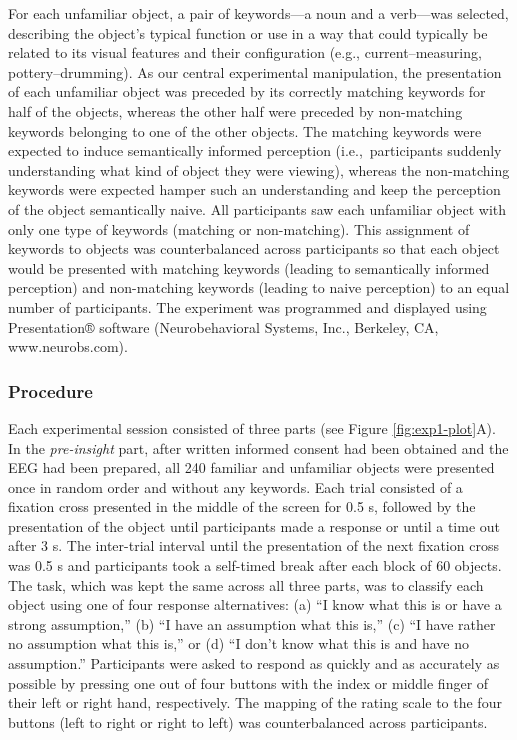 \documentclass[
  english,
  doc,12pt,twoside,floatsintext]{apa7}
\begin{document}
For each unfamiliar object, a pair of keywords---a noun and a verb---was selected, describing the object's typical function or use in a way that could typically be related to its visual features and their configuration (e.g., current--measuring, pottery--drumming). As our central experimental manipulation, the presentation of each unfamiliar object was preceded by its correctly matching keywords for half of the objects, whereas the other half were preceded by non-matching keywords belonging to one of the other objects. The matching keywords were expected to induce semantically informed perception (i.e.,~participants suddenly understanding what kind of object they were viewing), whereas the non-matching keywords were expected hamper such an understanding and keep the perception of the object semantically naive. All participants saw each unfamiliar object with only one type of keywords (matching or non-matching). This assignment of keywords to objects was counterbalanced across participants so that each object would be presented with matching keywords (leading to semantically informed perception) and non-matching keywords (leading to naive perception) to an equal number of participants. The experiment was programmed and displayed using Presentation® software (Neurobehavioral Systems, Inc., Berkeley, CA, www.neurobs.com).

\hypertarget{procedure}{%
\subsubsection{Procedure}\label{procedure}}

Each experimental session consisted of three parts (see Figure \ref{fig:exp1-plot}A). In the \emph{pre-insight} part, after written informed consent had been obtained and the EEG had been prepared, all 240 familiar and unfamiliar objects were presented once in random order and without any keywords. Each trial consisted of a fixation cross presented in the middle of the screen for 0.5 s, followed by the presentation of the object until participants made a response or until a time out after 3 s. The inter-trial interval until the presentation of the next fixation cross was 0.5 s and participants took a self-timed break after each block of 60 objects. The task, which was kept the same across all three parts, was to classify each object using one of four response alternatives: (a) ``I know what this is or have a strong assumption,'' (b) ``I have an assumption what this is,'' (c) ``I have rather no assumption what this is,'' or (d) ``I don't know what this is and have no assumption.'' Participants were asked to respond as quickly and as accurately as possible by pressing one out of four buttons with the index or middle finger of their left or right hand, respectively. The mapping of the rating scale to the four buttons (left to right or right to left) was counterbalanced across participants.
\end{document}
